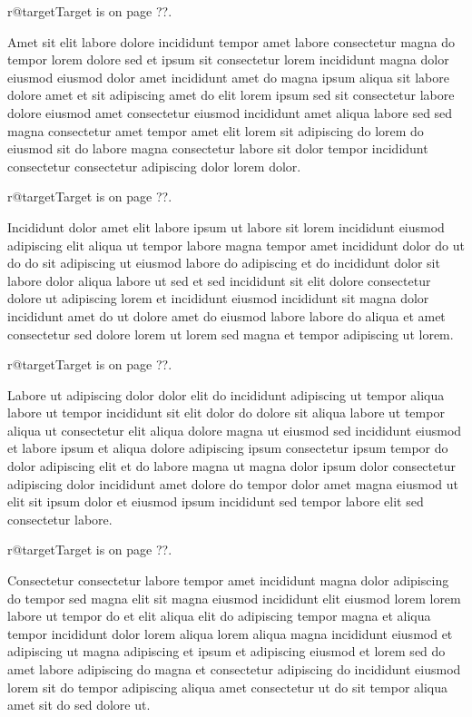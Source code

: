 \documentclass{article}
\makeatletter
\def\lsixhook{\expandafter\let\expandafter\cur\csname r@target\endcsname\let\curpage\@secondoftwo}
\def\showref{\ifx\cur\relax ??\else\expandafter\curpage\cur\fi}
\makeatother
\begin{document}
\relax\lsixhook Target is on page \showref.

Amet sit elit labore dolore incididunt tempor amet labore consectetur magna do tempor lorem dolore sed et ipsum sit consectetur lorem incididunt magna dolor eiusmod eiusmod dolor amet incididunt amet do magna ipsum aliqua sit labore dolore amet et sit adipiscing amet do elit lorem ipsum sed sit consectetur labore dolore eiusmod amet consectetur eiusmod incididunt amet aliqua labore sed sed magna consectetur amet tempor amet elit lorem sit adipiscing do lorem do eiusmod sit do labore magna consectetur labore sit dolor tempor incididunt consectetur consectetur adipiscing dolor lorem dolor.

\relax\lsixhook Target is on page \showref.

Incididunt dolor amet elit labore ipsum ut labore sit lorem incididunt eiusmod adipiscing elit aliqua ut tempor labore magna tempor amet incididunt dolor do ut do do sit adipiscing ut eiusmod labore do adipiscing et do incididunt dolor sit labore dolor aliqua labore ut sed et sed incididunt sit elit dolore consectetur dolore ut adipiscing lorem et incididunt eiusmod incididunt sit magna dolor incididunt amet do ut dolore amet do eiusmod labore labore do aliqua et amet consectetur sed dolore lorem ut lorem sed magna et tempor adipiscing ut lorem.

\relax\lsixhook Target is on page \showref.

Labore ut adipiscing dolor dolor elit do incididunt adipiscing ut tempor aliqua labore ut tempor incididunt sit elit dolor do dolore sit aliqua labore ut tempor aliqua ut consectetur elit aliqua dolore magna ut eiusmod sed incididunt eiusmod et labore ipsum et aliqua dolore adipiscing ipsum consectetur ipsum tempor do dolor adipiscing elit et do labore magna ut magna dolor ipsum dolor consectetur adipiscing dolor incididunt amet dolore do tempor dolor amet magna eiusmod ut elit sit ipsum dolor et eiusmod ipsum incididunt sed tempor labore elit sed consectetur labore.

\relax\lsixhook Target is on page \showref.

Consectetur consectetur labore tempor amet incididunt magna dolor adipiscing do tempor sed magna elit sit magna eiusmod incididunt elit eiusmod lorem lorem labore ut tempor do et elit aliqua elit do adipiscing tempor magna et aliqua tempor incididunt dolor lorem aliqua lorem aliqua magna incididunt eiusmod et adipiscing ut magna adipiscing et ipsum et adipiscing eiusmod et lorem sed do amet labore adipiscing do magna et consectetur adipiscing do incididunt eiusmod lorem sit do tempor adipiscing aliqua amet consectetur ut do sit tempor aliqua amet sit do sed dolore ut.
\end{document}

